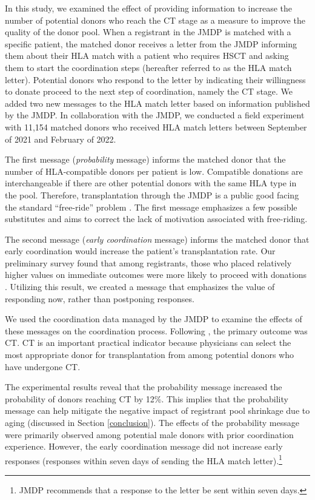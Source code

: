 \documentclass[12pt, a4paper]{article}
\begin{document}
In this study, we examined the effect of providing information to increase the number of potential donors who reach the CT stage as a measure to improve the quality of the donor pool. When a registrant in the JMDP is matched with a specific patient, the matched donor receives a letter from the JMDP informing them about their HLA match with a patient who requires HSCT and asking them to start the coordination steps (hereafter referred to as the HLA match letter). Potential donors who respond to the letter by indicating their willingness to donate proceed to the next step of coordination, namely the CT stage. We added two new messages to the HLA match letter based on information published by the JMDP. In collaboration with the JMDP, we conducted a field experiment with 11,154 matched donors who received HLA match letters between September of 2021 and February of 2022.

The first message (\emph{probability} message) informs the matched donor that the number of HLA-compatible donors per patient is low. Compatible donations are interchangeable if there are other potential donors with the same HLA type in the pool. Therefore, transplantation through the JMDP is a public good facing the standard ``free-ride'' problem \citep{Bergstrom2009}. The first message emphasizes a few possible substitutes and aims to correct the lack of motivation associated with free-riding.

The second message (\emph{early coordination} message) informs the matched donor that early coordination would increase the patient's transplantation rate. Our preliminary survey found that among registrants, those who placed relatively higher values on immediate outcomes were more likely to proceed with donations \citep{Ohtake2020}. Utilizing this result, we created a message that emphasizes the value of responding now, rather than postponing responses.

We used the coordination data managed by the JMDP to examine the effects of these messages on the coordination process. Following \citet{Haylock2024}, the primary outcome was CT. CT is an important practical indicator because physicians can select the most appropriate donor for transplantation from among potential donors who have undergone CT.

The experimental results reveal that the probability message increased the probability of donors reaching CT by 12\%. This implies that the probability message can help mitigate the negative impact of registrant pool shrinkage due to aging (discussed in Section \ref{conclusion}). The effects of the probability message were primarily observed among potential male donors with prior coordination experience. However, the early coordination message did not increase early responses (responses within seven days of sending the HLA match letter).\footnote{JMDP recommends that a response to the letter be sent within seven days.}
\end{document}
